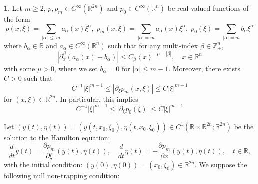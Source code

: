 \documentclass[10pt]{amsart}
\theoremstyle{definition}
\newtheorem{sourceenonce}[cdrthm]{\SourceEnonceName}
\newenvironment{enonce}[2][plain]{\def\SourceEnonceName{#2}\begin{sourceenonce}}{\end{sourceenonce}}
\renewcommand*\a{\alpha}
\renewcommand*\b{\beta}
\newcommand*\m{\mu}
\newcommand*\x{\xi}
\newcommand*\y{\eta}
\newcommand*\re{\mathbb{R}}
\newcommand*\ze{\mathbb{Z}}
\newcommand*\pa{\partial}
\newcommand{\jap}[1]{\left\langle #1 \right\rangle}
\begin{document}

\begin{enonce}[plain]{Assumption}\label{assa}
Let $m\geq 2$, $p, p_m\in C^{\infty}(\re^{2n})$ and $p_0\in C^{\infty}(\re^n)$ be real-valued functions of the form
\[
p(x,\x)=\sum_{|\a|\,\leq\,m}a_{\a}(x)\x^{\a},\; p_m(x,\x)=\sum_{|\a|=m}a_{\a}(x)\x^{\a},\; p_0(\x)=\sum_{|\a|=m}b_{\a}\x^{\a}
\]
where $b_{\a}\in \re$ and $a_{\a}\in C^{\infty}(\re^n)$ such that for any multi-index $\b\in\ze_+^n$,
\[
\left|\pa_{x}^{\b}(a_{\a}(x)-b_{\a})\right|\leq C_{\b}\jap{x}^{-\m-|\b|}, \quad x\in\re^n
\]
with some $\m>0$, where we set $b_{\a}=0$ for $|\a|\leq m-1$. Moreover, there exists $C>0$ such that
\[
C^{-1}|\x|^{m-1}\leq \left|\pa_{\x}p_m(x,\x)\right|\leq C|\x|^{m-1}
\]
for $(x,\x)\in \re^{2n}$. In particular, this implies
\[
C^{-1}|\x|^{m-1}\leq\left|\pa_{\x}p_0(\x)\right|\leq C|\x|^{m-1}
\]
\end{enonce}

Let $(y(t), \y(t))=(y(t, x_0, \x_0),\y(t, x_0, \x_0))\in C^1(\re\times\re^{2n};\re^{2n})$ be the solution to the Hamilton equation:
\[
\frac{d}{dt} y(t) =\frac{\pa p_m}{\pa \x}(y(t),\y(t)), \quad
\frac{d}{dt} \y(t) =-\frac{\pa p_m}{\pa x}(y(t),\y(t)), \quad t\in\re,
\]
with the initial condition: $(y(0),\y(0))=(x_0,\x_0)\in\re^{2n}$. We suppose the following null non-trapping condition:
\end{document}
